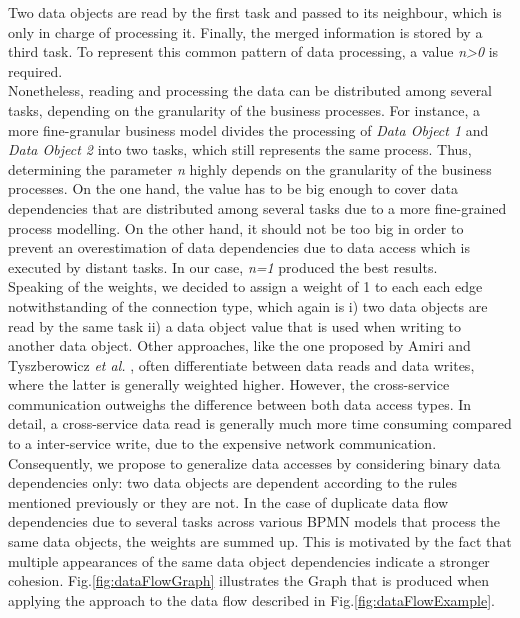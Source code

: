 \noindent
Two data objects are read by the first task and passed to its neighbour, which is only in charge of processing it. Finally, the merged information is stored by a third task. To represent this common pattern of data processing, a value \textit{n>0} is required. \\
Nonetheless, reading and processing the data can be distributed among several tasks, depending on the granularity of the business processes. For instance, a more fine-granular business model divides the processing of \textit{Data Object 1} and \textit{Data Object 2} into two tasks, which still represents the same process.
Thus, determining the parameter \textit{n} highly depends on the granularity of the business processes. On the one hand, the value has to be big enough to cover data dependencies that are distributed among several tasks due to a more fine-grained process modelling. On the other hand, it should not be too big in order to prevent an overestimation of data dependencies due to data access which is executed by distant tasks. In our case, \textit{n=1} produced the best results. \\
Speaking of the weights, we decided to assign a weight of 1 to each each edge notwithstanding of the connection type, which again is i) two data objects are read by the same task ii) a data object value that is used when writing to another data object. Other approaches, like the one proposed by Amiri \cite{ObjectAwareAmiri} and Tyszberowicz \textit{et al.} \cite{FunctionalDecompositionHeinrich}, often differentiate between data reads and data writes, where the latter is generally weighted higher. However, the cross-service communication outweighs the difference between both data access types. In detail, a cross-service data read is generally much more time consuming compared to a inter-service write, due to the expensive network communication. Consequently, we propose to generalize data accesses by considering binary data dependencies only: two data objects are dependent according to the rules mentioned previously or they are not. 
In the case of duplicate data flow dependencies due to several tasks across various BPMN models that process the same data objects, the weights are summed up. This is motivated by the fact that multiple appearances of the same data object dependencies indicate a stronger cohesion.
Fig.\ref{fig:dataFlowGraph} illustrates the Graph that is produced when applying the approach to the data flow described in Fig.\ref{fig:dataFlowExample}.






